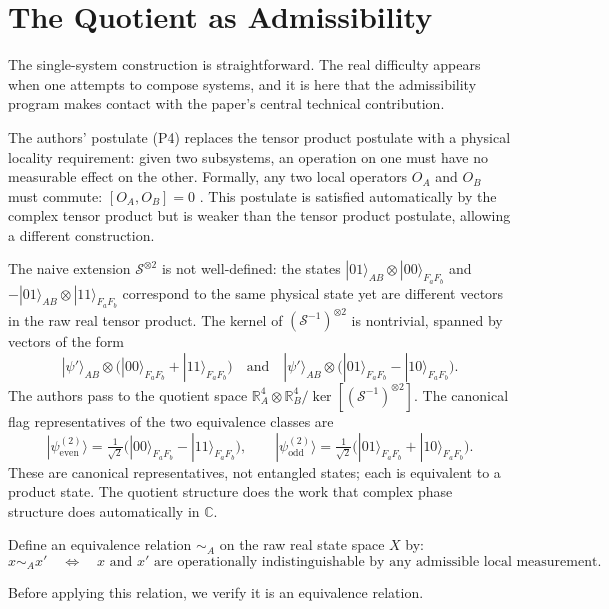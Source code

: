 \documentclass[12pt]{article}
\begin{document}
\section{The Quotient as Admissibility}

The single-system construction is straightforward. The real difficulty appears when one attempts to compose systems, and it is here that the admissibility program makes contact with the paper's central technical contribution.

The authors' postulate (P4) replaces the tensor product postulate with a physical locality requirement: given two subsystems, an operation on one must have no measurable effect on the other. Formally, any two local operators $O_A$ and $O_B$ must commute: $[O_A, O_B] = 0$ \cite{Barrios}. This postulate is satisfied automatically by the complex tensor product but is weaker than the tensor product postulate, allowing a different construction.

The naive extension $\mathcal{S}^{\otimes 2}$ is not well-defined: the states $|01\rangle_{AB} \otimes |00\rangle_{F_aF_b}$ and $-|01\rangle_{AB} \otimes |11\rangle_{F_aF_b}$ correspond to the same physical state yet are different vectors in the raw real tensor product. The kernel of $(\mathcal{S}^{-1})^{\otimes 2}$ is nontrivial, spanned by vectors of the form
\[
|\psi'\rangle_{AB} \otimes \bigl(|00\rangle_{F_aF_b} + |11\rangle_{F_aF_b}\bigr)
\quad\text{and}\quad
|\psi'\rangle_{AB} \otimes \bigl(|01\rangle_{F_aF_b} - |10\rangle_{F_aF_b}\bigr).
\]
The authors pass to the quotient space $\mathbb{R}^4_A \otimes \mathbb{R}^4_B / \ker[(\mathcal{S}^{-1})^{\otimes 2}]$. The canonical flag representatives of the two equivalence classes are
\[
|\psi^{(2)}_\text{even}\rangle = \tfrac{1}{\sqrt{2}}\bigl(|00\rangle_{F_aF_b} - |11\rangle_{F_aF_b}\bigr),
\qquad
|\psi^{(2)}_\text{odd}\rangle = \tfrac{1}{\sqrt{2}}\bigl(|01\rangle_{F_aF_b} + |10\rangle_{F_aF_b}\bigr).
\]
These are canonical representatives, not entangled states; each is equivalent to a product state. The quotient structure does the work that complex phase structure does automatically in $\mathbb{C}$.

Define an equivalence relation $\sim_A$ on the raw real state space $X$ by:
\[
x \sim_A x'
\quad \iff \quad
x \text{ and } x' \text{ are operationally indistinguishable by any admissible local measurement.}
\]

Before applying this relation, we verify it is an equivalence relation.
\end{document}
